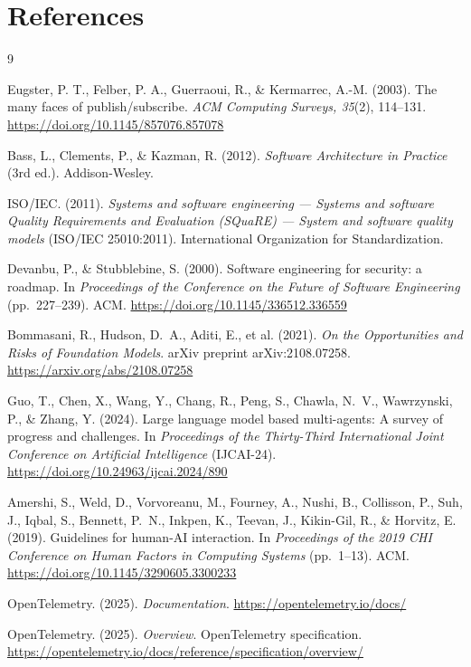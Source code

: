 \documentclass[11pt]{article}
\begin{document}
\section{References}

\begin{thebibliography}{9}

Eugster, P. T., Felber, P. A., Guerraoui, R., \& Kermarrec, A.-M. (2003). The many faces of publish/subscribe. \emph{ACM Computing Surveys, 35}(2), 114--131. \url{https://doi.org/10.1145/857076.857078}

Bass, L., Clements, P., \& Kazman, R. (2012). \emph{Software Architecture in Practice} (3rd ed.). Addison-Wesley.

ISO/IEC. (2011). \emph{Systems and software engineering --- Systems and software Quality Requirements and Evaluation (SQuaRE) --- System and software quality models} (ISO/IEC 25010:2011). International Organization for Standardization.

Devanbu, P., \& Stubblebine, S. (2000). Software engineering for security: a roadmap. In \emph{Proceedings of the Conference on the Future of Software Engineering} (pp.\ 227--239). ACM. \url{https://doi.org/10.1145/336512.336559}

Bommasani, R., Hudson, D.\ A., Aditi, E., et al. (2021). \emph{On the Opportunities and Risks of Foundation Models}. arXiv preprint arXiv:2108.07258. \url{https://arxiv.org/abs/2108.07258}

Guo, T., Chen, X., Wang, Y., Chang, R., Peng, S., Chawla, N.\ V., Wawrzynski, P., \& Zhang, Y. (2024). Large language model based multi-agents: A survey of progress and challenges. In \emph{Proceedings of the Thirty-Third International Joint Conference on Artificial Intelligence} (IJCAI-24). \url{https://doi.org/10.24963/ijcai.2024/890}

Amershi, S., Weld, D., Vorvoreanu, M., Fourney, A., Nushi, B., Collisson, P., Suh, J., Iqbal, S., Bennett, P.\ N., Inkpen, K., Teevan, J., Kikin-Gil, R., \& Horvitz, E. (2019). Guidelines for human-AI interaction. In \emph{Proceedings of the 2019 CHI Conference on Human Factors in Computing Systems} (pp.\ 1--13). ACM. \url{https://doi.org/10.1145/3290605.3300233}

OpenTelemetry. (2025). \emph{Documentation}. \url{https://opentelemetry.io/docs/}

OpenTelemetry. (2025). \emph{Overview}. OpenTelemetry specification. \url{https://opentelemetry.io/docs/reference/specification/overview/}


\end{thebibliography}
\end{document}
